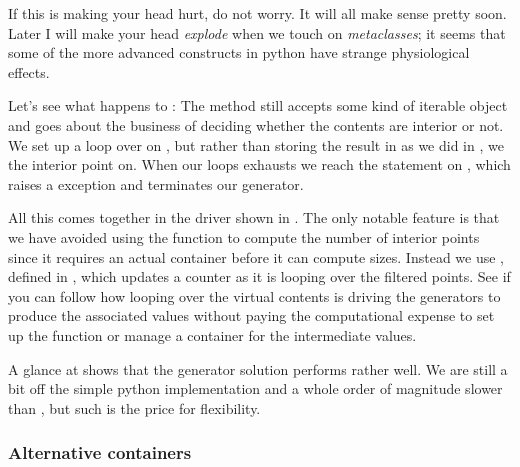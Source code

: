 If this is making your head hurt, do not worry. It will all make sense pretty soon. Later I
will make your head {\em explode} when we touch on {\em metaclasses}; it seems that some of the
more advanced constructs in python have strange physiological
effects\supercite{guido-metaclasses}.

Let's see what happens to :
%
%
The method  still accepts some kind of iterable object  and
goes about the business of deciding whether the contents are interior or not. We set up a loop
over  on , but rather than storing the
result in  as we did in , we 
the interior point on.  When our loops exhausts
 we reach the  statement on
, which raises a  exception and
terminates our generator.

All this comes together in the driver shown in . The only notable
feature is that we have avoided using the function  to compute the number of
interior points since it requires an actual container before it can compute sizes. Instead we
use , defined in , which updates a counter
as it is looping over the filtered points. See if you can follow how looping over the virtual
contents is driving the generators to produce the associated values without paying the
computational expense to set up the function or manage a container for the intermediate values.
%

A glance at  shows that the generator solution performs rather well. We
are still a bit off the simple python implementation and a whole order of magnitude slower than
\cpp, but such is the price for flexibility.

\subsubsection{Alternative containers}
\label{sec:classes:alternatives}

